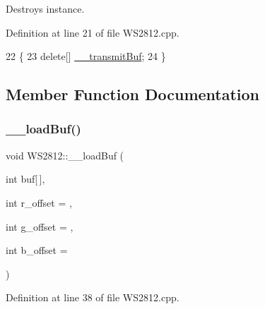 Destroys instance. 

Definition at line 21 of file W\+S2812.\+cpp.


\begin{DoxyCode}
22 \{
23     \textcolor{keyword}{delete}[] \hyperlink{class_w_s2812_a345b0895fb037ed603a79806bb7e510c}{\_\_transmitBuf};
24 \}
\end{DoxyCode}


\subsection{Member Function Documentation}
\mbox{\label{class_w_s2812_adfe7d119deac16639f987130f5db724e}} 
\subsubsection{\texorpdfstring{\+\_\+\+\_\+load\+Buf()}{\_\_loadBuf()}}
{\footnotesize\ttfamily void W\+S2812\+::\+\_\+\+\_\+load\+Buf (\begin{DoxyParamCaption}\item[{int}]{buf\mbox{[}$\,$\mbox{]},  }\item[{int}]{r\+\_\+offset = {},  }\item[{int}]{g\+\_\+offset = {},  }\item[{int}]{b\+\_\+offset = {} }\end{DoxyParamCaption})\hspace{0.3cm}{\ttfamily [private]}}



Definition at line 38 of file W\+S2812.\+cpp.


